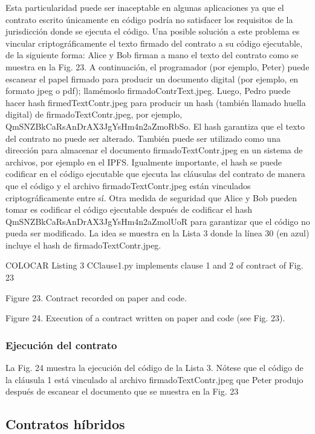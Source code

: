 \documentclass[12pt]{report} %
\begin{document}
\begin{itemize}
Esta particularidad puede ser inaceptable en algunas aplicaciones ya que el contrato escrito únicamente en código podría no satisfacer los requisitos de la jurisdicción donde se ejecuta el código. Una posible solución a este problema es vincular criptográficamente el texto firmado del contrato a su código ejecutable, de la siguiente forma: Alice y Bob firman a mano el texto del contrato como se muestra en la Fig. 23. A continuación, el programador (por ejemplo, Peter) puede escanear el papel firmado para producir un documento digital (por ejemplo, en formato jpeg o pdf); llamémoslo firmadoContrText.jpeg. Luego, Pedro puede hacer hash firmedTextContr.jpeg para producir un hash (también llamado huella digital) de
firmadoTextContr.jpeg, por ejemplo, QmSNZBkCaRsAnDrAX3JgYsHm4n2aZmoRbSo. El hash garantiza que el texto del contrato no puede ser alterado. También puede ser utilizado como una dirección para almacenar el documento firmadoTextContr.jpeg en un sistema de archivos, por ejemplo en el IPFS. Igualmente importante, el hash se puede codificar en el código ejecutable que ejecuta las cláusulas del contrato de manera que el código y el archivo firmadoTextContr.jpeg están vinculados criptográficamente entre sí. Otra medida de seguridad que Alice y Bob pueden tomar es codificar el código ejecutable después de codificar el hash QmSNZBkCaRsAnDrAX3JgYsHm4n2aZmolUoR para garantizar que el código no pueda ser modificado. La idea se muestra en la Lista 3 donde la línea 30 (en azul) incluye el hash de firmadoTextContr.jpeg.

COLOCAR Listing 3 CClause1.py implements clause 1 and 2 of contract of Fig. 23

Figure 23. Contract recorded on paper and code.

Figure 24. Execution of a contract written on paper and code (see Fig. 23).

\subsubsection{Ejecución del contrato}

La Fig. 24 muestra la ejecución del código de la Lista 3. Nótese que el código de la cláusula 1 está vinculado al archivo firmadoTextContr.jpeg que Peter produjo después de escanear el documento que se muestra en la Fig. 23

\subsection{Contratos híbridos}


\end{itemize}
\end{document}
